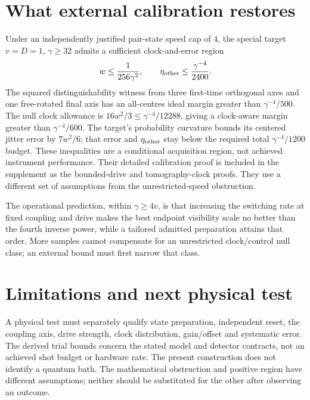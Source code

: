 \documentclass[11pt]{article}
\begin{document}
\section{What external calibration restores}
Under an independently justified pair-state speed cap of $4$, the special
target $v=D=1$, $\gamma\geq32$ admits a sufficient clock-and-error region
\[
 w\leq\frac1{256\gamma^2},\qquad
 \eta_{\rm other}\leq\frac{\gamma^{-4}}{2400}.
\]
The squared distinguishability witness from three first-time orthogonal
axes and one free-rotated final axis has an all-centres ideal margin
greater than $\gamma^{-4}/500$. The null clock allowance is
$16w^2/3\leq\gamma^{-4}/12288$, giving a clock-aware margin greater than
$\gamma^{-4}/600$. The target's probability curvature bounds its centered
jitter error by $7w^2/6$; that error and $\eta_{\rm other}$ stay below
the required total $\gamma^{-4}/1200$ budget.
These inequalities are a conditional acquisition region, not achieved
instrument performance. Their detailed calibration proof is included in
the supplement as the bounded-drive and tomography-clock proofs.
They use a different set of assumptions from
the unrestricted-speed obstruction.

The operational prediction, within $\gamma\geq4v$, is that increasing the
switching rate at fixed coupling and drive makes the best endpoint visibility scale no better than
the fourth inverse power, while a tailored admitted preparation attains
that order. More samples cannot compensate for an unrestricted clock/control
null class; an external bound must first narrow that class.



\section{Limitations and next physical test}
A physical test must separately qualify state preparation, independent reset,
the coupling axis, drive strength, clock distribution, gain/offset and
systematic error. The derived trial bounds concern the stated model and
detector contracts, not an achieved shot budget or hardware rate.
The present construction does not identify a quantum bath. The mathematical
obstruction and positive region have different assumptions; neither should
be substituted for the other after observing an outcome.
\end{document}
